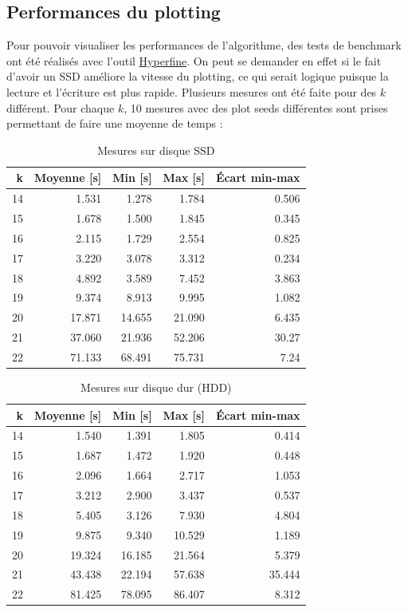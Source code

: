 \subsection{Performances du plotting}

Pour pouvoir visualiser les performances de l'algorithme, des tests de benchmark ont été réalisés avec l'outil \href{https://github.com/sharkdp/hyperfine}{Hyperfine}. On peut se demander en effet si le fait d'avoir un SSD améliore la vitesse du plotting, ce qui serait logique puisque la lecture et l'écriture est plus rapide. Plusieurs mesures ont été faite pour des $k$ différent. Pour chaque $k$, 10 mesures avec des plot seeds différentes sont prises permettant de faire une moyenne de temps :

\begin{table}[H]
  \centering
  \begin{tabular}{rrrrr}
    \textbf{k} & \textbf{Moyenne [s]} & \textbf{Min [s]} & \textbf{Max [s]} & \textbf{Écart min-max} \\
    \hline
    \hline
    14 & 1.531 & 1.278 & 1.784 & 0.506 \\
    \hline
    15 & 1.678 & 1.500   & 1.845 & 0.345 \\
    \hline
    16 & 2.115  & 1.729  & 2.554  & 0.825 \\
    \hline
    17 & 3.220   & 3.078  & 3.312  & 0.234 \\
    \hline
    18 & 4.892  & 3.589  & 7.452  & 3.863 \\
    \hline
    19 & 9.374  & 8.913  & 9.995  & 1.082 \\
    \hline
    20 & 17.871 & 14.655 & 21.090  & 6.435 \\
    \hline
    21 & 37.060  & 21.936 & 52.206 & 30.27 \\
    \hline
    22 & 71.133 & 68.491 & 75.731 & 7.24
  \end{tabular}
  \caption{Mesures sur disque SSD}
\end{table}

\begin{table}[H]
  \centering
  \begin{tabular}{rrrrr}
    \textbf{k} & \textbf{Moyenne [s]} & \textbf{Min [s]} & \textbf{Max [s]} & \textbf{Écart min-max} \\
    \hline
    \hline
    14 & 1.540  & 1.391  & 1.805  & 0.414  \\
    \hline
    15 & 1.687  & 1.472  & 1.920  & 0.448  \\
    \hline
    16 & 2.096  & 1.664  & 2.717  & 1.053  \\
    \hline
    17 & 3.212  & 2.900  & 3.437  & 0.537  \\
    \hline
    18 & 5.405  & 3.126  & 7.930  & 4.804  \\
    \hline
    19 & 9.875  & 9.340  & 10.529 & 1.189  \\
    \hline
    20 & 19.324 & 16.185 & 21.564 & 5.379  \\
    \hline
    21 & 43.438 & 22.194 & 57.638 & 35.444 \\
    \hline
    22 & 81.425 & 78.095 & 86.407 & 8.312
  \end{tabular}
  \caption{Mesures sur disque dur (HDD)}
\end{table}

